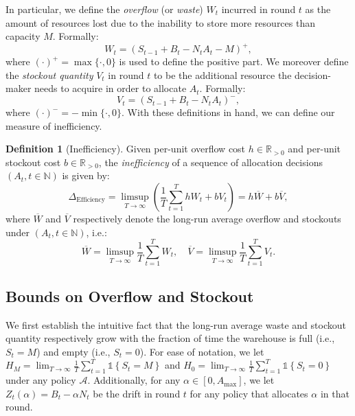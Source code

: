 \documentclass[10pt,a4paper]{amsart}
\theoremstyle{plain}
\theoremstyle{definition}
\newtheorem{definition}{Definition}
\theoremstyle{remark}
\newcommand{\N}{\mathbb{N}}
\newcommand{\ind}[1]{\mathds{1}\left\{#1\right\}}
\newcommand{\Deff}{\Delta_{\text{Efficiency}}\xspace}
\begin{document}
In particular, we define the {\it overflow} (or {\it waste}) $W_t$ incurred in round $t$ as the amount of resources lost due to the inability to store more resources than capacity $M$. Formally:
\begin{equation}\label{eq:waste}W_t = (S_{t-1} + B_t - N_t A_t - M)^+,
\end{equation}
where $(\cdot)^+ = \max\{\cdot, 0\}$ is used to define the positive part. We moreover define the {\it stockout quantity} $V_t$ in round $t$ to be the additional resource the decision-maker needs to acquire in order to allocate $A_t$. Formally:
\begin{equation}\label{eq:subsidy}V_t = (S_{t-1}+B_t-N_t A_t)^-,\end{equation}
where $(\cdot)^- = -\min\{\cdot, 0\}$.
With these definitions in hand, we can define our measure of inefficiency.
\begin{definition}[Inefficiency]
\label{def:efficiency}
Given per-unit overflow cost $h \in \mathbb{R}_{> 0}$ and per-unit stockout cost $b \in \mathbb{R}_{> 0}$, the \emph{inefficiency} of a sequence of allocation decisions $(A_t, t\in \N)$ is given by:
\begin{equation}
\label{eq:deff}
\Deff = \limsup_{T \rightarrow \infty} \left( \frac{1}{T} \sum_{t=1}^T hW_t + bV_t \right) =  h\overline{W} + b\overline{V},
\end{equation}
where $\overline{W}$ and $\overline{V}$ respectively denote the long-run average overflow and stockouts under $(A_t, t \in \mathbb{N})$, i.e.:
\begin{equation*}
\overline{W} = \limsup_{T \rightarrow \infty} \frac{1}{T} \sum_{t=1}^T W_t, \quad \overline{V} = \limsup_{T \rightarrow \infty} \frac{1}{T} \sum_{t=1}^T V_t.
\end{equation*}
\end{definition}

\subsection{Bounds on Overflow and Stockout}
\label{ssec:timehomogen}


We first establish the intuitive fact that the long-run average waste and stockout quantity respectively grow with the fraction of time the warehouse is full (i.e., $S_t = M$) and empty (i.e., $S_t = 0$). For ease of notation, we let $H_M = \lim_{T \rightarrow \infty}\frac{1}{T}\sum_{t=1}^T \ind{S_{t} = M}$ and $H_0 = \lim_{T \rightarrow \infty}\frac{1}{T}\sum_{t=1}^T \ind{S_{t} = 0}$ under any policy $\mathcal{A}$. Additionally, for any $\alpha \in [0,A_{\max}]$, we let $Z_t(\alpha) = B_t - \alpha N_t$ be the drift in round $t$ for any policy that allocates $\alpha$ in that round.
\end{document}
